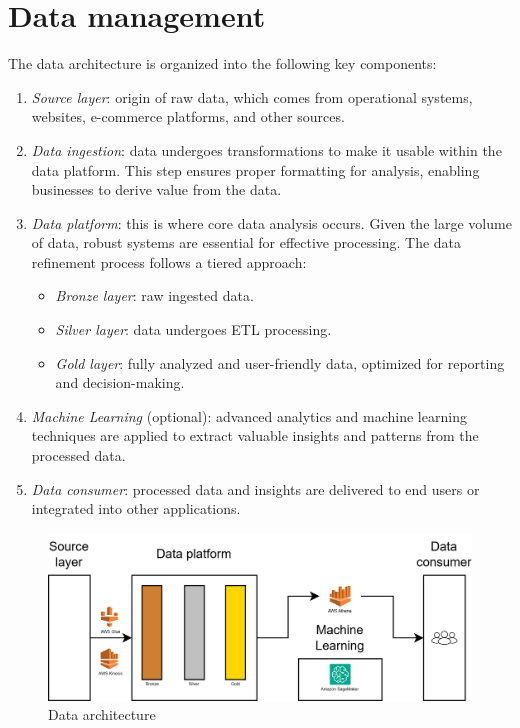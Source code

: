 \section{Data management}

The data architecture is organized into the following key components:
\begin{enumerate}
    \item \textit{Source layer}: origin of raw data, which comes from operational systems, websites, e-commerce platforms, and other sources.
    \item \textit{Data ingestion}: data undergoes transformations to make it usable within the data platform. 
        This step ensures proper formatting for analysis, enabling businesses to derive value from the data.
    \item \textit{Data platform}: this is where core data analysis occurs. 
        Given the large volume of data, robust systems are essential for effective processing. 
        The data refinement process follows a tiered approach:
        \begin{itemize}
            \item \textit{Bronze layer}: raw ingested data.
            \item \textit{Silver layer}: data undergoes ETL processing.
            \item \textit{Gold layer}: fully analyzed and user-friendly data, optimized for reporting and decision-making.
        \end{itemize}
    \item \textit{Machine Learning} (optional): advanced analytics and machine learning techniques are applied to extract valuable insights and patterns from the processed data.
    \item \textit{Data consumer}: processed data and insights are delivered to end users or integrated into other applications.
\end{enumerate}

\begin{figure}[H]
    \centering
    \includegraphics[width=0.75\linewidth]{images/bis11.png}
    \caption{Data architecture}
\end{figure}

